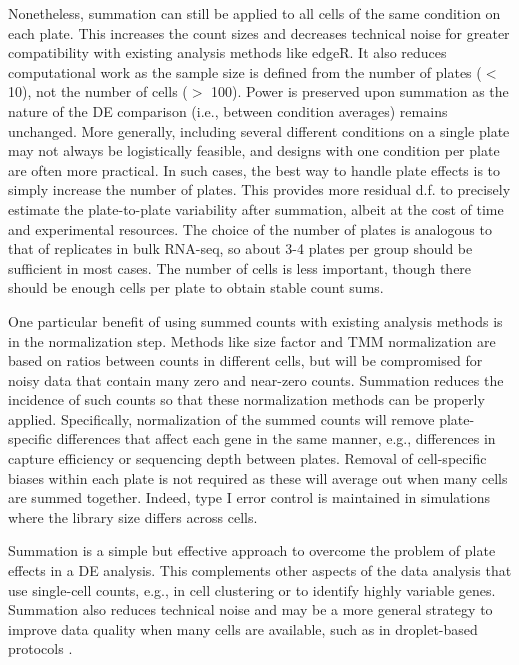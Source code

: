 \documentclass{article}
\begin{document}
Nonetheless, summation can still be applied to all cells of the same condition on each plate.
This increases the count sizes and decreases technical noise for greater compatibility with existing analysis methods like edgeR.
It also reduces computational work as the sample size is defined from the number of plates ($<$ 10), not the number of cells ($>$ 100).
Power is preserved upon summation as the nature of the DE comparison (i.e., between condition averages) remains unchanged.
More generally, including several different conditions on a single plate may not always be logistically feasible, and designs with one condition per plate are often more practical.
In such cases, the best way to handle plate effects is to simply increase the number of plates.
This provides more residual d.f. to precisely estimate the plate-to-plate variability after summation, albeit at the cost of time and experimental resources.
The choice of the number of plates is analogous to that of replicates in bulk RNA-seq, so about 3-4 plates per group should be sufficient in most cases.
The number of cells is less important, though there should be enough cells per plate to obtain stable count sums.

One particular benefit of using summed counts with existing analysis methods is in the normalization step.
Methods like size factor and TMM normalization are based on ratios between counts in different cells,
    but will be compromised for noisy data that contain many zero and near-zero counts.
Summation reduces the incidence of such counts so that these normalization methods can be properly applied.
Specifically, normalization of the summed counts will remove plate-specific differences that affect each gene in the same manner, 
    e.g., differences in capture efficiency or sequencing depth between plates.
Removal of cell-specific biases within each plate is not required as these will average out when many cells are summed together.
Indeed, type I error control is maintained in simulations where the library size differs across cells.


Summation is a simple but effective approach to overcome the problem of plate effects in a DE analysis. 
This complements other aspects of the data analysis that use single-cell counts, e.g., in cell clustering or to identify highly variable genes.
Summation also reduces technical noise and may be a more general strategy to improve data quality when many cells are available,
    such as in droplet-based protocols \cite{klein2015droplet,macosko2015highly}.



\end{document}
